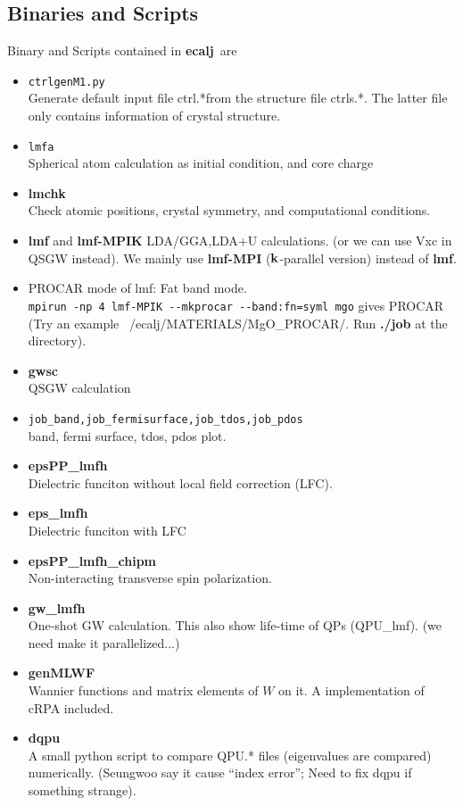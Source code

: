 \documentclass[a4paper,10pt,epsf,fleqn]{article}
\newcommand{\bfk}{{\bf k}}
\newcommand{\exe}[1]{{\bf #1}}
\newcommand{\io}[1]{{\sf  #1}}
\newcommand{\ecalj}{{\bf ecalj}\ }
\newcommand{\lmchk}{{\exe{lmchk}\space }}
\newcommand{\ctrl}{{\io{ctrl.*}\space }}
\newcommand{\ctrls}{{\io{ctrls.*}\space }}
\begin{document}
\subsection{Binaries and Scripts}
Binary and Scripts contained in \ecalj are
\begin{itemize}
\item {\tt ctrlgenM1.py}\\
  Generate default input file \ctrl from the structure file
  \ctrls. The latter file only contains information of crystal structure.
\item {\tt lmfa}\\
  Spherical atom calculation as initial condition, and core charge 
\item \lmchk\\
  Check atomic positions, crystal symmetry, and computational conditions.
\item \exe{lmf} and \exe{lmf-MPIK}
  LDA/GGA,LDA+U calculations. (or we can use Vxc in QSGW instead).
  We mainly use \exe{lmf-MPI} ($\bfk$-parallel version) instead of \exe{lmf}.
\item 
  PROCAR mode of lmf: Fat band mode.\\
  \verb#mpirun -np 4 lmf-MPIK --mkprocar --band:fn=syml mgo# gives PROCAR \\
   (Try an example \io{~/ecalj/MATERIALS/MgO\_PROCAR/}. 
    Run \exe{./job} at the directory).
\item \exe{gwsc}\\
     QSGW calculation
\item \verb#job_band,job_fermisurface,job_tdos,job_pdos#\\
     band, fermi surface, tdos, pdos plot.
\item \exe{epsPP\_lmfh}\\
     Dielectric funciton without local field correction (LFC).
\item \exe{eps\_lmfh}\\
     Dielectric funciton with LFC
\item \exe{epsPP\_lmfh\_chipm}\\
      Non-interacting transverse spin polarization.
\item \exe{gw\_lmfh}\\ One-shot GW calculation. 
       This also show life-time of QPs (\io{QPU\_lmf}).
      (we need make it parallelized...)
\item \exe{genMLWF}\\ Wannier functions and matrix elements of $W$ on
      it. A implementation of cRPA included.
\item \exe{dqpu}\\
      A small python script to compare QPU.* files (eigenvalues are
      compared) numerically. 
      (Seungwoo say it cause ``index error''; Need to fix dqpu if
      something strange).
\end{itemize}
\end{document}
